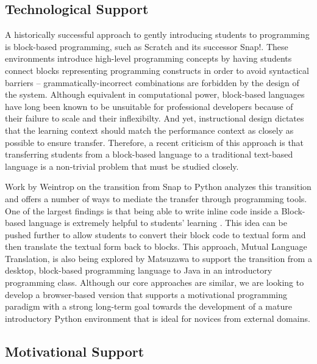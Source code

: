 \documentclass{sig-alternate}
\begin{document}
\subsection{Technological Support}

A historically successful approach to gently introducing students to programming is block-based programming, such as Scratch and its successor Snap!.
These environments introduce high-level programming concepts by having students connect blocks representing programming constructs in order to avoid syntactical barriers -- grammatically-incorrect combinations are forbidden by the design of the system.
Although equivalent in computational power, block-based languages have long been known to be unsuitable for professional developers because of their failure to scale and their inflexibilty. 
And yet, instructional design dictates that the learning context should match the performance context as closely as possible to ensure transfer.
Therefore, a recent criticism of this approach is that transferring students from a block-based language to a traditional text-based language is a non-trivial problem that must be studied closely.

Work by Weintrop on the transition from Snap to Python analyzes this transition and offers a number of ways to mediate the transfer through programming tools. 
One of the largest findings is that being able to write inline code inside a Block-based language is extremely helpful to students' learning \cite{Weintrop}.
This idea can be pushed further to allow students to convert their block code to textual form and then translate the textual form back to blocks.
This approach, Mutual Language Translation, is also being explored by Matsuzawa\cite{Matsuzawa} to support the transition from a desktop, block-based programming language to Java in an introductory programming class. 
Although our core approaches are similar, we are looking to develop a browser-based version that supports a motivational programming paradigm with a strong long-term goal towards the development of a mature introductory Python environment that is ideal for novices from external domains.

\subsection{Motivational Support}
\end{document}
